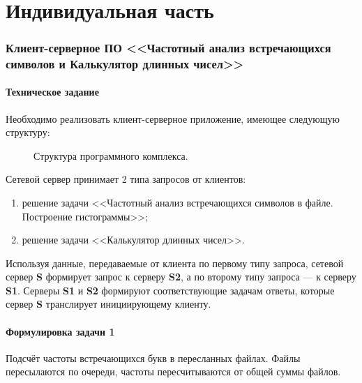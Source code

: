 \documentclass[a4paper,14pt]{extarticle}
\newcommand{\SOFTWARE}{Частотный анализ встречающихся символов и Калькулятор длинных чисел}
\begin{document}
\newpage
\
\part{Индивидуальная часть}

\section{Клиент-серверное ПО <<\SOFTWARE>>}

\subsection{Техническое задание}
Необходимо реализовать клиент-серверное приложение, имеющее следующую структуру:

\begin{figure}[h]
\caption{Структура программного комплекса.}
\label{1.png}
\end{figure}
 
Сетевой сервер принимает 2 типа запросов от клиентов: 
\begin{enumerate}
	\item решение задачи <<Частотный анализ встречающихся символов в файле. Построение гистограммы>>;
	\item решение задачи <<Калькулятор длинных чисел>>.
\end{enumerate}
Используя данные, передаваемые от клиента по первому типу запроса, сетевой сервер \textbf{S} формирует запрос к серверу \textbf{S2}, а по второму типу запроса --- к серверу \textbf{S1}. Серверы \textbf{S1} и \textbf{S2} формируют соответствующие задачам ответы, которые сервер \textbf{S} транслирует инициирующему клиенту. 

\subsection{Формулировка задачи 1}
Подсчёт частоты встречающихся букв в пересланных файлах. Файлы пересылаются по очереди, частоты пересчитываются от общей суммы файлов.
\end{document}

